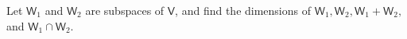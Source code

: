 Let $\mathsf{W}_1$ and $\mathsf{W}_2$ are subspaces of $\mathsf{V}$,
and find the dimensions of
$\mathsf{W}_1,\mathsf{W}_2,\mathsf{W}_1+\mathsf{W}_2, $ and $
\mathsf{W}_1 \cap \mathsf{W}_2$.
